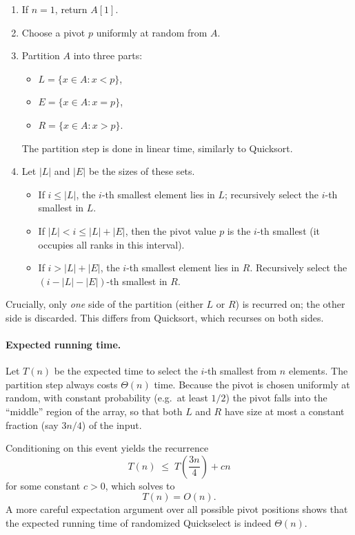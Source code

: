 \documentclass[9pt]{extarticle}
\begin{document}
\begin{enumerate}
    \item If \(n = 1\), return \(A[1]\).
    \item Choose a pivot \(p\) uniformly at random from \(A\).
    \item Partition \(A\) into three parts:
          \begin{itemize}
              \item \(L = \{x \in A : x < p\}\),
              \item \(E = \{x \in A : x = p\}\),
              \item \(R = \{x \in A : x > p\}\).
          \end{itemize}
          The partition step is done in linear time, similarly to Quicksort.
    \item Let \(|L|\) and \(|E|\) be the sizes of these sets.
          \begin{itemize}
              \item If \(i \le |L|\), the \(i\)-th smallest element lies in \(L\);
                    recursively select the \(i\)-th smallest in \(L\).
              \item If \(|L| < i \le |L| + |E|\), then the pivot value \(p\) is the
                    \(i\)-th smallest (it occupies all ranks in this interval).
              \item If \(i > |L| + |E|\), the \(i\)-th smallest element lies in \(R\).
                    Recursively select the \((i - |L| - |E|)\)-th smallest in \(R\).
          \end{itemize}
\end{enumerate}

Crucially, only \emph{one} side of the partition (either \(L\) or \(R\)) is
recurred on; the other side is discarded.  This differs from Quicksort, which
recurses on both sides.

\paragraph{Expected running time.}
Let \(T(n)\) be the expected time to select the \(i\)-th smallest from \(n\)
elements.  The partition step always costs \(\Theta(n)\) time.  Because the
pivot is chosen uniformly at random, with constant probability (e.g.\ at least
\(1/2\)) the pivot falls into the ``middle'' region of the array, so that both
\(L\) and \(R\) have size at most a constant fraction (say \(3n/4\)) of the
input.

Conditioning on this event yields the recurrence
\[
    T(n) \;\le\; T\!\left(\frac{3n}{4}\right) + c n
\]
for some constant \(c > 0\), which solves to
\[
    T(n) = O(n).
\]
A more careful expectation argument over all possible pivot positions shows
that the expected running time of randomized Quickselect is indeed
\(\Theta(n)\).
\end{document}
